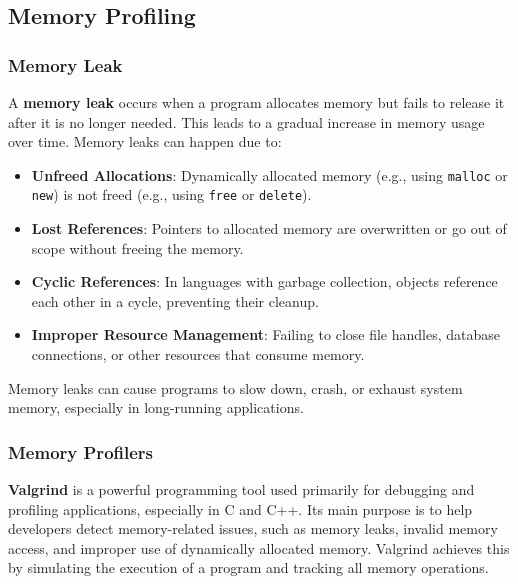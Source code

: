 \documentclass{article}
\begin{document}
\subsection{Memory Profiling}
\subsubsection{Memory Leak}
A \textbf{memory leak} occurs when a program allocates memory but fails to release it after it is no longer needed. This leads to a gradual increase in memory usage over time. Memory leaks can happen due to:

\begin{itemize}
  \item \textbf{Unfreed Allocations}: Dynamically allocated memory (e.g., using \texttt{malloc} or \texttt{new}) is not freed (e.g., using \texttt{free} or \texttt{delete}).
  \item \textbf{Lost References}: Pointers to allocated memory are overwritten or go out of scope without freeing the memory.
  \item \textbf{Cyclic References}: In languages with garbage collection, objects reference each other in a cycle, preventing their cleanup.
  \item \textbf{Improper Resource Management}: Failing to close file handles, database connections, or other resources that consume memory.
\end{itemize}

Memory leaks can cause programs to slow down, crash, or exhaust system memory, especially in long-running applications.

\subsubsection{Memory Profilers}
\textbf{Valgrind} is a powerful programming tool used primarily for debugging and profiling applications, especially in C and C++. Its main purpose is to help developers detect memory-related issues, such as memory leaks, invalid memory access, and improper use of dynamically allocated memory. Valgrind achieves this by simulating the execution of a program and tracking all memory operations.
\end{document}
